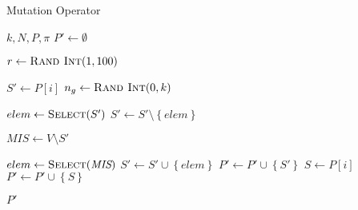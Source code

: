 \begin{algorithm}[t]
  \caption{Mutation Operator}\label{alg:GENETIKUS_ALGORITMUS:MUTACIO}
  \begin{algorithmic}[1]
    \Require $k, N, P, \pi$
    \State $P' \leftarrow \emptyset$

    \State $r \leftarrow \Call{Rand Int}{1, 100}$

    \State $S' \leftarrow P[i]$
    \State $n_{g} \leftarrow \Call{Rand Int}{0, k}$

    \State $elem \leftarrow \Call{Select}{S'}$
    \State $S' \leftarrow S' \setminus \left\{ elem \right\}$
    \EndFor

    \State $\textit{MIS} \leftarrow V \setminus S'$

    \State $elem \leftarrow \Call{Select}{\textit{MIS}}$
    \State $S' \leftarrow S' \cup \left\{ elem \right\}$
    \EndWhile
    \State $P' \leftarrow P' \cup \left\{ S' \right\}$
    \Else
    \State $S \leftarrow P\left[ i \right]$
    \State $P' \leftarrow P' \cup \left\{ S \right\}$
    \EndIf
    \EndFor

    \State \Return $P'$
  \end{algorithmic}
\end{algorithm}
